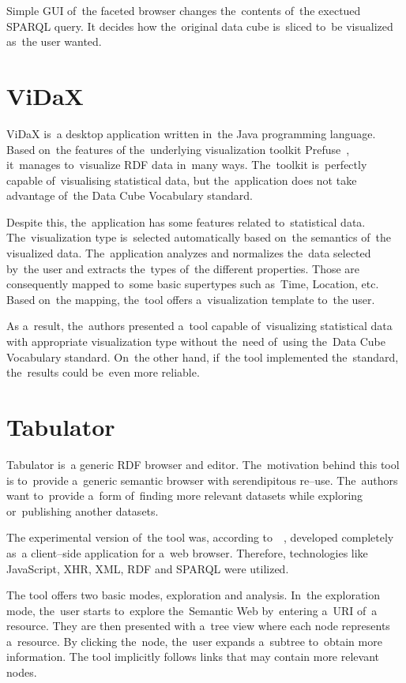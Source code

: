 Simple GUI of~the faceted browser changes the~contents of~the exectued SPARQL query. 
It decides how the~original data cube is~sliced to~be visualized as~the user 
wanted.

\section{ViDaX}
ViDaX is~a desktop application written in~the Java programming language. Based on~the features
of the~underlying visualization toolkit Prefuse~\cite{prefuse}, it~manages to~visualize RDF data in~many ways. The~toolkit is~perfectly capable of~visualising statistical data, but the~application does not take advantage of~the 
Data Cube Vocabulary standard.

Despite this, the~application has some features related to~statistical 
data. The~visualization type is~selected automatically based on~the semantics of~the 
visualized data. The~application analyzes and normalizes the~data selected by~the user 
and extracts the~types of~the different properties. Those are consequently mapped to~some basic supertypes such as~Time, Location, etc. Based on~the mapping,
the~tool offers a~visualization template to~the user.

As a~result, the~authors presented a~tool capable of~visualizing 
statistical data with appropriate visualization type without the~need of~using 
the~Data Cube Vocabulary standard. On~the other hand, if~the tool 
implemented the~standard, the~results could be~even more reliable.

\section{Tabulator}
\label{sec:rw:tabulator}
Tabulator is~a generic RDF browser and editor. The~motivation behind this tool
is to~provide a~generic semantic browser with serendipitous re--use. The~authors 
want to~provide a~form of~finding more relevant datasets while exploring or~publishing another datasets. 

The experimental version of~the tool was, according to~~\cite{tabulator-paper}, 
developed completely as~a client--side application for a~web browser. Therefore, 
technologies like JavaScript, XHR, XML, RDF and SPARQL were utilized.

The tool offers two basic modes, exploration and analysis. In~the exploration mode,
the~user starts to~explore the~Semantic Web by~entering a~URI of~a resource. They 
are then presented with a~tree view where each node represents a~resource. 
By clicking the~node, the~user expands a~subtree to~obtain more information.
The tool implicitly follows links that may contain more relevant nodes.

